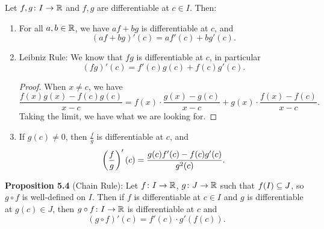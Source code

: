 \documentclass[class=article, crop=false]{standalone}
\begin{document}
  \begin{theorem}{5.3}
    Let $f,g\colon I\to \mathbb{R}$ and $f, g$ are differentiable at $c\in I$. Then:
    \begin{enumerate}[label=(\roman*)]
      \item For all $a, b\in\mathbb{R}$, we have $af + bg$ is differentiable at $c$, and
      \[
        (af + bg)'(c) = af'(c) + bg'(c).
      \]
      \item Leibniz Rule: We know that $fg$ is differentiable at $c$, in particular
      \[
        (fg)'(c) = f'(c)g(c) + f(c)g'(c).
      \]
      \begin{proof}
        When $x\neq c$, we have
        \[
          \frac{f(x)g(x) - f(c)g(c)}{x - c} = f(x)\cdot \frac{g(x) - g(c)}{x - c} + g(x)\cdot \frac{f(x) - f(c)}{x - c}.
        \]
        Taking the limit, we have what we are looking for.
      \end{proof}
      \item If $g(c)\neq 0$, then $\frac{f}{g}$ is differentiable at $c$, and
      \[
        \left( \frac{f}{g} \right)'(c) = \frac{g(c)f'(c) - f(c)g'(c)}{g^2(c)}.
      \]
    \end{enumerate}
  \end{theorem}
  \textbf{Proposition 5.4} (Chain Rule): Let $f\colon I\to \mathbb{R}$, $g\colon J\to \mathbb{R}$ such that $f(I)\subseteq J$, so $g\circ f$ is well-defined on $I$. Then if $f$ is differentiable at $c\in I$ and $g$ is differentiable at $g(c)\in J$, then $g\circ f\colon I\to \mathbb{R}$ is differentiable at $c$ and
  \[
    (g\circ f)'(c) = f'(c)\cdot g'(f(c)).
  \]
\end{document}
